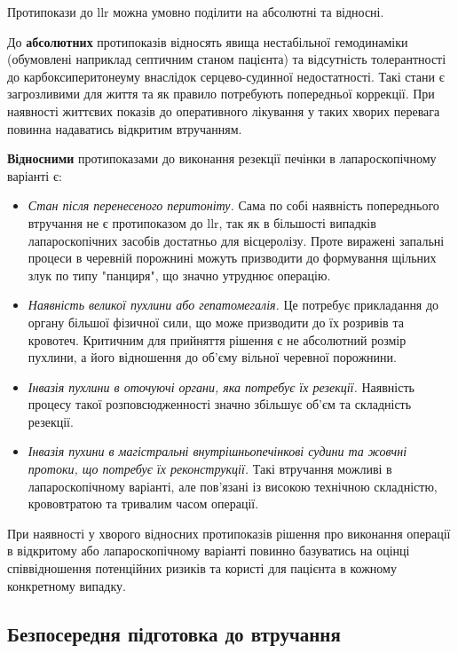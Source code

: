 \begin{refsection}
Протипокази до \acrshort{llr} можна умовно поділити на абсолютні та відносні. 

До \textbf{абсолютних} протипоказів відносять явища нестабільної гемодинаміки (обумовлені наприклад септичним станом пацієнта) та відсутність толерантності до карбоксиперитонеуму внаслідок серцево-судинної недостатності. Такі стани є загрозливими для життя та як правило потребують попередньої коррекції. При наявності життєвих показів до оперативного лікування у таких хворих перевага повинна надаватись відкритим втручанням. 

\textbf{Відносними} протипоказами до виконання резекції печінки в лапароскопічному варіанті є: 
\begin{itemize}
  \item \textit{Стан після перенесеного перитоніту.} Сама по собі наявність попереднього втручання не є протипоказом до \acrshort{llr}, так як в більшості випадків лапароскопічних засобів достатньо для вісцеролізу. Проте виражені запальні процеси в черевній порожнині можуть призводити до формування щільних злук по типу "панциря", що значно утруднює операцію.
  
  \item \textit{Наявність великої пухлини або гепатомегалія.} Це потребує прикладання до органу більшої фізичної сили, що може призводити до їх розривів та кровотеч. Критичним для прийняття рішення є не абсолютний розмір пухлини, а його відношення до об'єму вільної черевної порожнини.
  
  \item \textit{Інвазія пухлини в оточуючі органи, яка потребує їх резекції.} Наявність процесу такої розповсюдженності значно збільшує об'єм та складність резекції. 
  
  \item \textit{Інвазія пухини в магістральні внутрішньопечінкові судини та жовчні протоки, що потребує їх реконструкції.} Такі втручання можливі в лапароскопічному варіанті, але пов'язані із високою технічною складністю, крововтратою та тривалим часом операції.
  
\end{itemize}

При наявності у хворого відносних протипоказів рішення про виконання операції в відкритому або лапароскопічному варіанті повинно базуватись на оцінці співвідношення потенційних ризиків та користі для пацієнта в кожному конкретному випадку. 

\subsection{Безпосередня підготовка до втручання}


\end{refsection}
